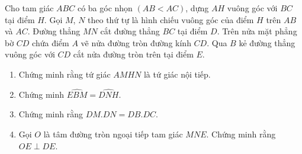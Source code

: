 \begin{bt}
    Cho tam giác $ABC$ có ba góc nhọn $(AB<AC)$, dựng $AH$ vuông góc với $BC$ tại điểm $H$. Gọi $M$, $N$ theo thứ tự là hình chiếu vuông góc của điểm $H$ trên $AB$ và $AC$. Đường thẳng $MN$ cắt đường thẳng $BC$ tại điểm $D$. Trên nửa mặt phẳng bờ $CD$ chứa điểm $A$ vẽ nửa đường tròn đường kính $CD$. Qua $B$ kẻ đường thẳng vuông góc với $CD$ cắt nửa đường tròn trên tại điểm $E$.
    \begin{enumerate}
        \item Chứng minh rằng tứ giác $AMHN$ là tứ giác nội tiếp.
        \item Chứng minh $\widehat{EBM}=\widehat{DNH}$.
        \item Chứng minh rằng $DM.DN=DB.DC$.
        \item Gọi $O$ là tâm đường tròn ngoại tiếp tam giác $MNE$. Chứng minh rằng $OE\perp DE$.
    \end{enumerate}
    \loigiai
    {
    \begin{center}
    \end{center}
    }
\end{bt}
